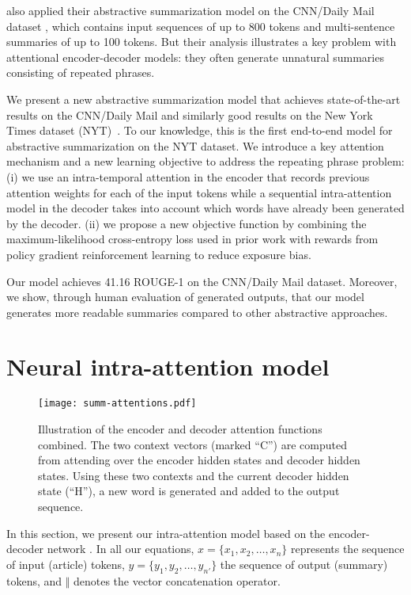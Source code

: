 \documentclass{article} \usepackage{iclr2018_arxiv,times}
\begin{document}
\citet{nallapati2016} also applied their abstractive summarization model on the CNN/Daily Mail dataset \citep{hermann2015}, which contains input sequences of up to 800 tokens and multi-sentence summaries of up to 100 tokens.
But their analysis illustrates a key problem with attentional encoder-decoder models:
they often generate unnatural summaries consisting of repeated phrases.

We present a new abstractive summarization model that achieves state-of-the-art results on the CNN/Daily Mail and similarly good results on the New York Times dataset (NYT)~\citep{sandhaus2008}. To our knowledge, this is the first end-to-end model for abstractive summarization on the NYT dataset.
We introduce a key attention mechanism and a new learning objective to address the repeating phrase problem: (i) we use an intra-temporal attention in the encoder that records previous attention weights for each of the input tokens while a sequential intra-attention model in the decoder takes into account which words have already been generated by the decoder. 
(ii) we propose a new objective function by combining the maximum-likelihood cross-entropy loss used in prior work with rewards from policy gradient reinforcement learning to reduce exposure bias.

Our model achieves 41.16 ROUGE-1 on the CNN/Daily Mail dataset.
Moreover, we show, through human evaluation of generated outputs, that our model generates more readable summaries compared to other abstractive approaches.


\section{Neural intra-attention model}

\begin{figure*}
\centering
\texttt{[image: summ-attentions.pdf]}
\caption{Illustration of the encoder and decoder attention functions combined. The two context vectors (marked ``C'') are computed from attending over the encoder hidden states and decoder hidden states. Using these two contexts and the current decoder hidden state (``H''), a new word is generated and added to the output sequence.}
\label{fig:sum-attentions}
\end{figure*}

\label{sec:model}

In this section, we present our intra-attention model based on the encoder-decoder network \citep{sutskever2014}. In all our equations, $x = \{x_1, x_2, \ldots, x_n\}$ represents the sequence of input (article) tokens, $y = \{y_1, y_2, \ldots, y_{n'}\}$ the sequence of output (summary) tokens, and $\Vert$ denotes the vector concatenation operator.
\end{document}
